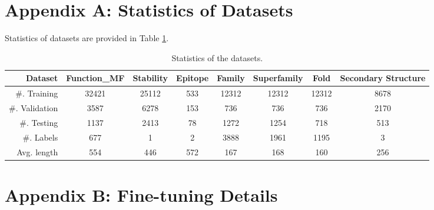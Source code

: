 \documentclass{article}
\begin{document}




\clearpage

\appendix

\section*{Appendix A: Statistics of Datasets}
Statistics of datasets are provided in Table \ref{dataset}.

\begin{table}[ht]
\centering
\small
\begin{tabular}{rccccccc}
\toprule
Dataset   & \textbf{Function\_MF} & \textbf{Stability} & \textbf{Epitope} & \textbf{Family} & \textbf{Superfamily} & \textbf{Fold} & \textbf{Secondary Structure} \\
\midrule
\#. Training   & 32421            & 25112             & 533             & 12312           & 12312                & 12312         & 8678                        \\ \hline
\#. Validation & 3587             & 6278              & 153             & 736             & 736                  & 736           & 2170                        \\ \hline
\#. Testing    & 1137             & 2413              & 78              & 1272            & 1254                 & 718           & 513                         \\ \hline
\#. Labels     & 677              & 1                 & 2               & 3888            & 1961                 & 1195          & 3                           \\ \hline
Avg. length   & 554              & 446               & 572             & 167             & 168                  & 160           & 256                         \\
\bottomrule
\end{tabular}
\caption{Statistics of the datasets.}
\label{dataset}
\end{table}

\section*{Appendix B: Fine-tuning Details}
\end{document}
